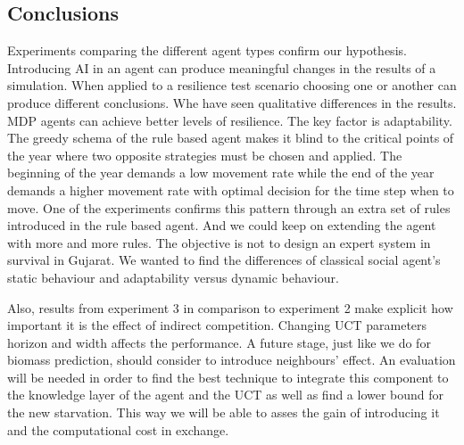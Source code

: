 \documentclass[11pt,oneside,a4paper,openright]{report}
\begin{document}

\subsection{Conclusions}

	
Experiments comparing the different agent types confirm our hypothesis. Introducing AI in an agent can produce
meaningful changes in the results of a simulation. When applied to a resilience test scenario choosing
one or another can produce different conclusions. Whe have seen qualitative differences in the results. MDP agents can achieve better levels of resilience. The key factor is adaptability. The greedy schema of the 
rule based agent makes it blind to the critical points of the year where two opposite strategies must be
chosen and applied. The beginning of the year demands a low movement rate while the end of the year demands
a higher movement rate with optimal decision for the time step when to move. One of the experiments confirms this pattern through an extra set of rules introduced in the rule based agent. And we could keep on extending
the agent with more and more rules. The objective is not to design an expert system in survival in Gujarat.
We wanted to find the differences of classical social agent's static behaviour and adaptability versus dynamic behaviour.

Also, results from experiment 3 in comparison to experiment 2 make explicit how important it is the effect of
indirect competition. Changing UCT parameters horizon and width affects the performance. A future stage, just like we do for biomass prediction, should consider to introduce
neighbours' effect. An evaluation will be needed in order to find the best technique to integrate this component to the knowledge layer of the agent and the UCT as well as find a lower bound for the new starvation. This way we will be able to asses the gain of introducing it and the computational cost in exchange.
\end{document}
